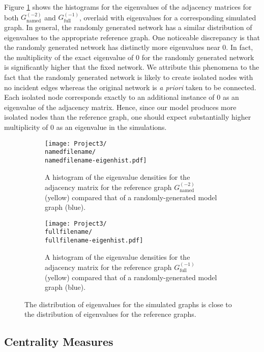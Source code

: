 \documentclass[11]{article}
\newcommand{\namedfilename}{namedminus2-2p}
\newcommand{\fullfilename}{fullminus1-2p}
\newcommand{\namedtwo}{G_{\textrm{named}}^{(-2)}}
\newcommand{\fullone}{G_{\textrm{full}}^{(-1)}}
\theoremstyle{remark}
\theoremstyle{definition}
\begin{document}
Figure \ref{fig:eigenvalues} shows the histograms for the eigenvalues of the adjacency matrices for both $\namedtwo$ and $\fullone$, overlaid with eigenvalues for a corresponding simulated graph. In general, the randomly generated network has a similar distribution of eigenvalues to the appropriate reference graph. One noticeable discrepancy is that the randomly generated network has distinctly more eigenvalues near 0. In fact, the multiplicity of the exact eigenvalue of 0 for the randomly generated network is significantly higher that the fixed network. We attribute this phenomena to the fact that the randomly generated network is likely to create isolated nodes with no incident edges whereas the original network is {\it a priori} taken to be connected. Each isolated node corresponds exactly to an additional instance of 0 as an eigenvalue of the adjacency matrix. Hence, since our model produces more isolated nodes than the reference graph, one should expect substantially higher multiplicity of 0 as an eigenvalue in the simulations.

\begin{figure} [h!]
  \centering
      \begin{subfigure}[t]{0.4\linewidth}
    \texttt{[image: Project3/\\namedfilename/\\namedfilename-eigenhist.pdf]}
    \caption{A histogram of the eigenvalue densities for the adjacency matrix for the reference graph $\namedtwo$ (yellow) compared that of a randomly-generated model graph (blue).}
    \end{subfigure} \hfill
    \begin{subfigure}[t]{0.4\linewidth}
    \texttt{[image: Project3/\\fullfilename/\\fullfilename-eigenhist.pdf]}
    \caption{A histogram of the eigenvalue densities for the adjacency matrix for the reference graph $\fullone$ (yellow) compared that of a randomly-generated model graph (blue).} 
    \end{subfigure} \hfill
  \caption{The distribution of eigenvalues for the simulated graphs is close to the distribution of eigenvalues for the reference graphs.}
  \label{fig:eigenvalues}
\end{figure}

\subsection{Centrality Measures}
\end{document}
